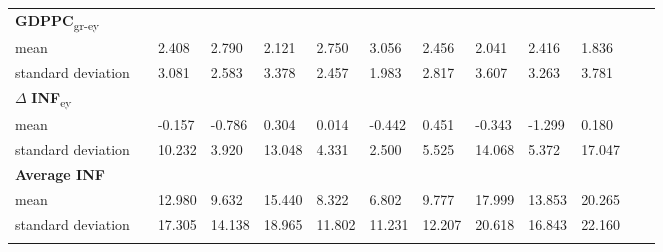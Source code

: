 \begin{table}[H]
{\begin{tabular}{lC{1cm}C{1cm}C{1.8cm}C{1.8cm}C{1.8cm}C{1.8cm}C{1.8cm}C{1.8cm}C{1.8cm}C{1.8cm}C{1.8cm}C{1.8cm}}
\textbf{GDPPC}\textsubscript{gr-ey} \\
mean & & 2.408 & 2.790 & 2.121 & 2.750 & 3.056 & 2.456 & 2.041 & 2.416 & 1.836\\
standard deviation & & 3.081 & 2.583 & 3.378 & 2.457 & 1.983 & 2.817 & 3.607 & 3.263 & 3.781\\ [0.5em]
		
$\Delta$ \textbf{INF}\textsubscript{ey} \\
mean & & -0.157 & -0.786 & 0.304 & 0.014 & -0.442 & 0.451 & -0.343 & -1.299 & 0.180\\
standard deviation & & 10.232 & 3.920 & 13.048 & 4.331 & 2.500 & 5.525 & 14.068 & 5.372 & 17.047\\ [0.5em]
		
\textbf{Average INF} \\
mean & & 12.980 & 9.632 & 15.440 & 8.322 & 6.802 & 9.777 & 17.999 & 13.853 & 20.265\\
standard deviation & & 17.305 & 14.138 & 18.965 & 11.802 & 11.231 & 12.207 & 20.618 & 16.843 & 22.160\\ [0.5em]

\hline\hline \\[2em]
\end{tabular}
}
\label{table_descriptives}
\end{table} 